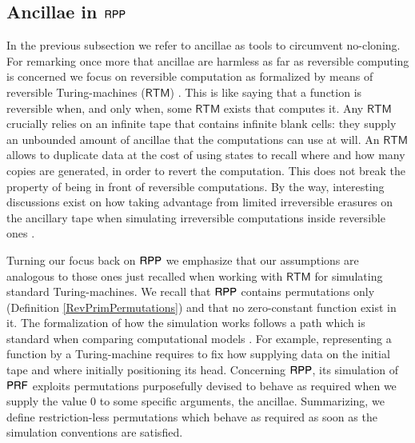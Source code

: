 \subsection{Ancillae in $ \mathsf{RPP} $} 
In the previous subsection we refer to ancillae as tools to circumvent no-cloning.
For remarking once more that ancillae are harmless as far as reversible computing is concerned 
we focus on reversible computation as formalized by means of reversible Turing-machines ($\mathsf{RTM}$)
\cite{axelsen11lncs,axelsen16acta,bennett73ibm,jacopini90siam}. 
This is like saying that a function is reversible when, and only when, some $\mathsf{RTM}$ exists that computes it.
Any $\mathsf{RTM}$ crucially relies on an infinite tape that  contains infinite blank cells:  
they supply an unbounded amount of ancillae that the computations can use at will.
An $\mathsf{RTM}$ allows to duplicate data at the cost of using states to recall where and how many copies are generated,
in order to revert the computation. This does not break the property of being in front of reversible computations.
By the way, interesting discussions exist on how taking advantage from limited irreversible erasures on the ancillary tape 
when simulating irreversible computations inside reversible ones \cite{bennett1989siamjc,buhrman2001lncs,li1996royal}.

Turning our focus back on $\mathsf{RPP}$ we emphasize that our assumptions are analogous to those ones just recalled when working with $ \mathsf{RTM} $
for simulating standard Turing-machines.
We recall that $ \mathsf{RPP} $ contains permutations only (Definition \ref{RevPrimPermutations}) and  
that no zero-constant function exist in it.
The formalization of how the simulation works follows a path which is standard when comparing computational models 
\cite{cutland1980book,malcev70book,odifreddi1989book}.
For example, representing a function by a Turing-machine requires to fix how supplying data on the initial tape 
and where initially positioning its head.
Concerning $ \mathsf{RPP} $, its simulation of $ \mathsf{P}\mathsf{RF} $ exploits permutations purposefully devised to behave as required when we supply the value
0 to some specific arguments, the ancillae. 
Summarizing, we define restriction-less permutations which behave as required as soon as the simulation conventions are satisfied.

